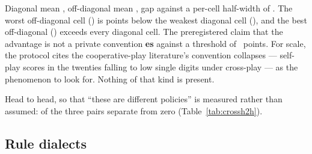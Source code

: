 \begin{table}[t]\centering
\caption{Cross-play. Three runs of the frozen architecture, independently trained on disjoint fitting
banks with different search trajectories and, for one, a different starting basin; pairwise parameter
distance \vsevenXpDistanceLo{}--\vsevenXpDistanceHi{} over \vsevenCoordinates{} coordinates.}
\label{tab:crossplay}
{\small}
\end{table}

Diagonal mean \vsevenXpDiagonal{}, off-diagonal mean \vsevenXpOffDiagonal{}, gap
\vsevenXpGap{} against a per-cell half-width of \vsevenXpHalfWidth{}. The worst off-diagonal cell
(\vsevenXpWorstOff{}) is \vsevenXpWorstOffShortfall{} points below the weakest diagonal cell
(\vsevenXpWeakestDiag{}), and the best off-diagonal (\vsevenXpBestOff{}) exceeds every diagonal
cell. The preregistered claim that the advantage is not a
private convention \textbf{\vsevenStwoVerdict{}es} against a threshold of
\vsevenStwoThreshold{}~points. For scale, the protocol cites the cooperative-play literature's
convention collapses --- self-play scores in the twenties falling to low single digits under
cross-play --- as the phenomenon to look for. Nothing of that kind is present.

Head to head, so that ``these are different policies'' is measured rather than assumed:
\vsevenHtwohSeparated{} of the three pairs separate from zero (Table~\ref{tab:crossh2h}).

\begin{table}[t]\centering
\caption{The three runs head to head. \vsevenHtwohSeparated{} of the three pairs separate from
zero, which is what establishes that these are distinguishable policies rather than one policy
thrice.}
\label{tab:crossh2h}

\end{table}

\subsection{Rule dialects}
\label{sec:results-dialects}

\begin{table}[t]\centering
\caption{The rule-dialect table, unbundled. Both arms play the same dialect in every row. This is the
first dialect sweep of its kind in the corpus and has no training-bank counterpart to be checked
against.}
\label{tab:dialects}
{\small}
\end{table}

